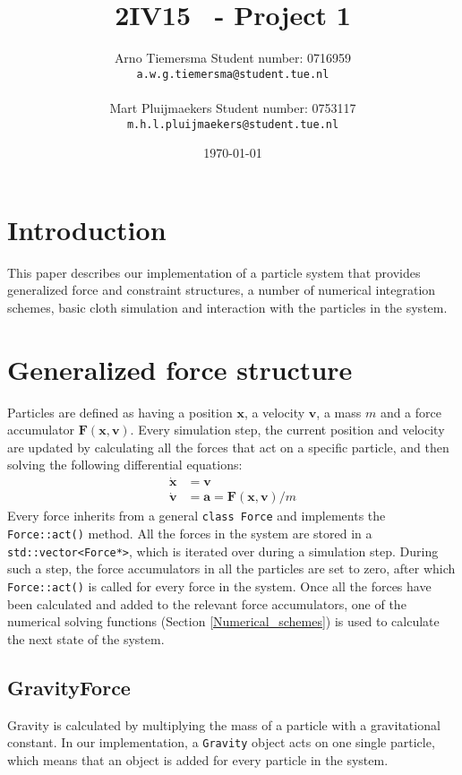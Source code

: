 \documentclass[a4paper,twoside,11pt,twocolumn]{article}
\title{\sffamily\bfseries 2IV15 \scg\ - Project 1}
\author{Arno Tiemersma \qquad Student number: 0716959 \\{\tt a.w.g.tiemersma@student.tue.nl}\\ \\Mart Pluijmaekers \qquad Student number: 0753117 \\{\tt m.h.l.pluijmaekers@student.tue.nl}}
\date{\today}
\begin{document}
\maketitle
\section{Introduction}
This paper describes our implementation of a particle system that provides generalized force and constraint structures, a number of numerical integration schemes, basic cloth simulation and interaction with the particles in the system.

\section{Generalized force structure}
Particles are defined as having a position $\mathbf{x}$, a velocity $\mathbf{v}$, a mass $m$ and a force accumulator $\mathbf{F}(\mathbf{x, v})$. Every simulation step, the current position and velocity are updated by calculating all the forces that act on a specific particle, and then solving the following differential equations:
\begin{align}
	\dot{\mathbf{x}} &= \mathbf{v}\\
	\dot{\mathbf{v}} &= \mathbf{a} = \mathbf{F}(\mathbf{x},\mathbf{v})/m
\end{align}
Every force inherits from a general \texttt{class Force} and implements the \texttt{Force::act()} method. All the forces in the system are stored in a \texttt{std::vector<Force*>}, which is iterated over during a simulation step. During such a step, the force accumulators in all the particles are set to zero, after which \texttt{Force::act()} is called for every force in the system. Once all the forces have been calculated and added to the relevant force accumulators, one of the numerical solving functions (Section \ref{Numerical_schemes}) is used to calculate the next state of the system.
\subsection{GravityForce}
Gravity is calculated by multiplying the mass of a particle with a gravitational constant. In our implementation, a \texttt{Gravity} object acts on one single particle, which means that an object is added for every particle in the system.
\end{document}
